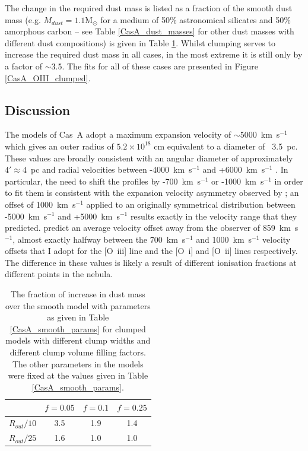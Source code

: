 The change in the required dust mass is listed as a fraction of the smooth dust mass (e.g. $M_{dust}=1.1$M$_{\odot}$ for a medium of 50\% astronomical silicates and 50\% amorphous carbon -- see Table \ref{CasA_dust_masses} for other dust masses with different dust compositions) is given in Table \ref{CasA_clumped_dust_masses}.  Whilst clumping serves to increase the required dust mass in all cases, in the most extreme it is still only by a factor of $\sim$3.5.  The fits for all of these cases are presented in Figure \ref{CasA_OIII_clumped}.

\subsection{Discussion}

The models of Cas~A adopt a maximum expansion velocity of $\sim5000$~km~s$^{-1}$ which gives an outer radius of  $5.2\times10^{18}$ cm equivalent to a diameter of ~3.5~pc.   These values are broadly consistent with an angular diameter of approximately $4'\approx4$~pc \citep{Hurford1996} and radial velocities between -4000~km~s$^{-1}$ and +6000~km~s$^{-1}$ \citep{DeLaney2010}.  In particular, the need to shift the profiles by -700~km~s$^{-1}$ or -1000~km~s$^{-1}$ in order to fit them is consistent with the expansion velocity asymmetry observed by \citet{DeLaney2010}; an offset of 1000~km~s$^{-1}$ applied to an originally symmetrical distribution between -5000~km~s$^{-1}$ and +5000~km~s$^{-1}$ results exactly in the velocity range that they predicted.  \citet{DeLaney2010} predict an average velocity offset away from the observer of 859~km~s$^{-1}$, almost exactly halfway between the 700~km~s$^{-1}$ and 1000~km~s$^{-1}$  velocity offsets that I adopt for the [O~{\sc iii}] line and the [O~{\sc i}] and [O~{\sc ii}] lines respectively.  The difference in these values is likely a result of different ionisation fractions at different points in the nebula.

\begin{table}
\caption{The fraction of increase in dust mass over the smooth model with parameters as given in Table \ref{CasA_smooth_params} for clumped models with different clump widths and different clump volume filling factors.  The other parameters in the models were fixed at the values given in Table \ref{CasA_smooth_params}.}
\centering
\begin{tabular}{l  c c c}
\hline
& $f=0.05$ &$f=0.1$&$f=0.25$\\
\hline
$R_{out}/10$ & 3.5 & 1.9 & 1.4 \\
$R_{out}/25$ & 1.6 & 1.0 & 1.0 \\
\hline
\end{tabular}
\label{CasA_clumped_dust_masses}
\end{table}

